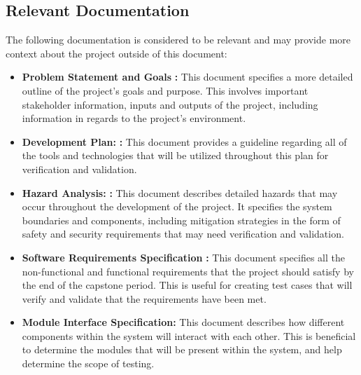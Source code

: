 \documentclass[12pt, titlepage]{article}
\begin{document}
\subsection{Relevant Documentation}


The following documentation is considered to be relevant and may provide more context about the project outside of this document:
\begin{itemize}
  \item \textbf{Problem Statement and Goals} \citep{ProblemStatementGoals}\textbf{:} This document specifies a more detailed outline of the project's goals and purpose. This involves important stakeholder information, inputs and outputs of the project, including information in regards to the project's environment.
  \item \textbf{Development Plan:} \citep{DevelopmentPlan}\textbf{:} This document provides a guideline regarding all of the tools and technologies that will be utilized throughout this plan for verification and validation.
  \item \textbf{Hazard Analysis:} \citep{HazardAnalysis}\textbf{:} This document describes detailed hazards that may occur throughout the development of the project. It specifies the system boundaries and components, including mitigation strategies in the form of safety and security requirements that may need verification and validation.
  \item \textbf{Software Requirements Specification} \citep{SRS}\textbf{:} This document specifies all the non-functional and functional requirements that the project should satisfy by the end of the capstone period. This is useful for creating test cases that will verify and validate that the requirements have been met.
  \item \textbf{Module Interface Specification:} This document describes how different components within the system will interact with each other. This is beneficial to determine the modules that will be present within the system, and help determine the scope of testing.

\end{itemize}
\end{document}
